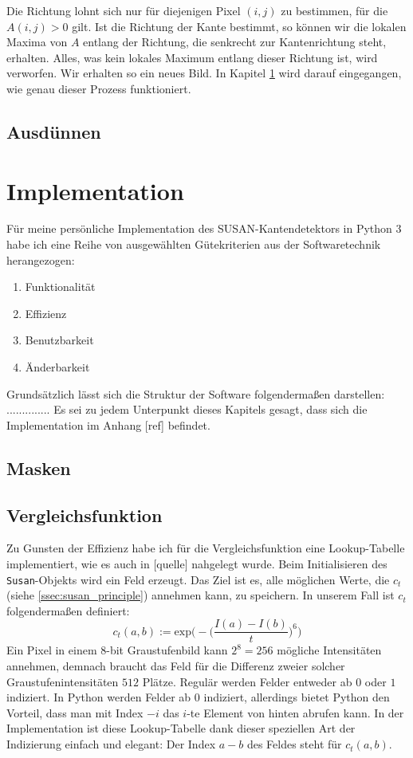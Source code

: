 \documentclass[a4paper, 11pt]{report}
\theoremstyle{definition}
\begin{document}
			Die Richtung lohnt sich nur für diejenigen Pixel $(i,j)$ zu bestimmen, für die $A(i,j) > 0$ gilt. Ist die Richtung der Kante bestimmt, so können wir die lokalen Maxima von $A$ entlang der Richtung, die senkrecht zur Kantenrichtung steht, erhalten. Alles, was kein lokales Maximum entlang dieser Richtung ist, wird verworfen. Wir erhalten so ein neues Bild. In Kapitel \ref{sec:implementation} wird darauf eingegangen, wie genau dieser Prozess funktioniert.

		\subsection{Ausdünnen}

		\section{Implementation}\label{sec:implementation}
		Für meine persönliche Implementation des SUSAN-Kantendetektors in Python 3 habe ich eine Reihe von ausgewählten Gütekriterien aus der Softwaretechnik herangezogen:
			\begin{enumerate}
				\item Funktionalität
				\item Effizienz
				\item Benutzbarkeit
				\item Änderbarkeit
			\end{enumerate}
		Grundsätzlich lässt sich die Struktur der Software folgendermaßen darstellen: ..............
		Es sei zu jedem Unterpunkt dieses Kapitels gesagt, dass sich die Implementation im Anhang [ref] befindet.
		
		\subsection{Masken}


		\subsection{Vergleichsfunktion}
			Zu Gunsten der Effizienz habe ich für die Vergleichsfunktion eine Lookup-Tabelle implementiert, wie es auch in [quelle] nahgelegt wurde. Beim Initialisieren des \texttt{Susan}-Objekts wird ein Feld erzeugt. Das Ziel ist es, alle möglichen Werte, die $c_t$ (siehe \ref{ssec:susan_principle}) annehmen kann, zu speichern.
			In unserem Fall ist $c_t$ folgendermaßen definiert:
			$$ 
				c_t(a,b) :=  
					\text{exp}\bigg(-\Big(\frac{I(a) - I(b)}{t}\Big)^6\bigg)
			$$
			Ein Pixel in einem 8-bit Graustufenbild kann $2^8 = 256$ mögliche Intensitäten annehmen, demnach braucht das Feld für die Differenz zweier solcher Graustufenintensitäten $512$ Plätze.
			Regulär werden Felder entweder ab $0$ oder $1$ indiziert. In Python werden Felder ab $0$ indiziert, allerdings bietet Python den Vorteil, dass man mit Index $-i$ das $i$-te Element von hinten abrufen kann. In der Implementation ist diese Lookup-Tabelle dank dieser speziellen Art der Indizierung einfach und elegant: Der Index $a-b$ des Feldes steht für $c_t(a,b)$.
\end{document}

